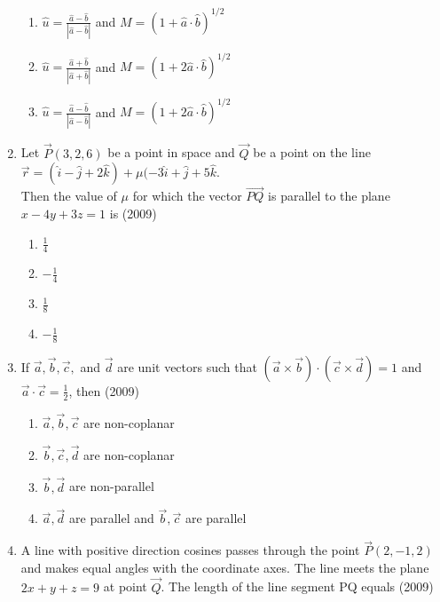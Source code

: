 \documentclass[journal,12pt,twocolumn]{IEEEtran}
\theoremstyle{remark}
\begin{document}
\begin{enumerate}
\begin{enumerate}
    \item $\hat{u} = \frac{\hat{a}-\hat{b}}{|\hat{a}-\hat{b}|}$  and $M = (1+\hat{a} \cdot \hat{b})^{1/2}$
    \item $\hat{u} = \frac{\hat{a}+\hat{b}}{|\hat{a}+\hat{b}|}$  and $M = (1+2\hat{a} \cdot \hat{b})^{1/2}$
    \item $\hat{u} = \frac{\hat{a}-\hat{b}}{|\hat{a}-\hat{b}|}$  and $M = (1+2\hat{a} \cdot \hat{b})^{1/2}$
    \end{enumerate}
    \item Let $\vec{P}(3,2,6)$ be a point in space and $\vec{Q}$ be a point on the line \\ 
    $\vec{r} = (\hat{i} - \hat{j} + 2\hat{k}) + \mu(-3\hat{i} +\hat{j}+5\hat{k}.$
    \\ Then the value of $\mu$ for which the vector $\overrightarrow{PQ}$ is parallel to the plane $x-4y+3z=1$ is
    \hfill{(2009)}
    \begin{multicols}{2}
    \begin{enumerate}
    \item $\frac{1}{4}$
    \item $-\frac{1}{4}$
    \item $\frac{1}{8}$
    \item $-\frac{1}{8}$
    \end{enumerate}
    \end{multicols}
    \item If $\vec{a}, \vec{b}, \vec{c},$ and $\vec{d}$ are unit vectors such that $(\vec{a} \times \vec{b}) \cdot (\vec{c} \times \vec{d}) = 1$ and $\vec{a} \cdot \vec{c} = \frac{1}{2}$, then
    \hfill{(2009)}
    \begin{enumerate}
    \item $\vec{a}, \vec{b}, \vec{c}$ are non-coplanar
    \item $\vec{b}, \vec{c}, \vec{d}$ are non-coplanar
    \item $\vec{b}, \vec{d}$ are non-parallel
    \item $\vec{a}, \vec{d}$ are parallel and $\vec{b}, \vec{c}$ are parallel 
    \end{enumerate}
    \item A line with positive direction cosines passes through the point $\vec{P}(2,-1,2)$ and makes equal angles with the coordinate axes. The line meets the plane $2x+y+z=9$ at point $\vec{Q}$. The length of the line segment PQ equals 
    \hfill{(2009)}
    \begin{multicols}{2}
    \begin{enumerate}

\end{enumerate}
\end{multicols}
\end{enumerate}
\end{document}
